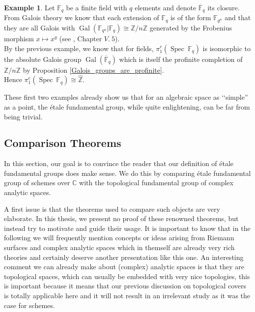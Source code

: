 \documentclass{article}
\theoremstyle{plain}
\theoremstyle{definition}
\newtheorem{example}[theorem]{Example}
\DeclareMathOperator{\Spec}{Spec}
\DeclareMathOperator{\Gal}{Gal}
\begin{document}
\begin{example}
    Let $\mathbb{F}_q$ be a finite field with $q$ elements and denote $\overline{\mathbb{F}}_q$ its closure.
    From Galois theory we know that each extension of $\mathbb{F}_q$ is of the form $\mathbb{F}_{q^n}$ and that they are all Galois with $\Gal(\mathbb{F}_{q^n}|\mathbb{F}_q) \cong \mathbb{Z}/n\mathbb{Z}$ generated by the Frobenius morphism $x\mapsto x^q$ (see \cite{Lang_algebra}, Chapter $V.\:5$).\\
    By the previous example, we know that for fields, $\pi^e_1(\Spec\: \mathbb{F}_q)$ is isomorphic to the absolute Galois group  $\Gal(\overline{\mathbb{F}}_q)$ which is itself the profinite completion of $\mathbb{Z}/n\mathbb{Z}$ by Proposition \ref{Galois_groups_are_profinite}.\\
    Hence $\pi^e_1(\Spec\: \mathbb{F}_q) \cong \widehat{\mathbb{Z}}$.
\end{example}


\noindent These first two examples  already show us that for an algebraic space as ‘‘simple'' as a point, the \'etale fundamental group, while quite enlightening, can be far from being trivial.\\


\subsection{Comparison Theorems}
\label{comparaison_theorem}

In this section, our goal is to convince the reader that our definition of \'etale fundamental groups does make sense. 
We do this by comparing \'etale fundamental group of schemes over $\mathbb{C}$ with the topological fundamental group of complex analytic spaces.

\noindent A first issue is that the theorems used to compare such objects are very elaborate. 
In this thesis, we present no proof of these renowned theorems, but instead try to motivate and guide their usage. 
It is important to know that in the following we will frequently mention concepts or ideas arising from Riemann surfaces and complex analytic spaces which in themself are already very rich theories and certainly deserve another presentation like this one.
An interesting comment we can already make about (complex) analytic spaces is that they are topological spaces, which can usually be embedded with very nice topologies, this is important because it means that our previous discussion on topological covers is totally applicable here and it will not result in an irrelevant study as it was the case for schemes.\\
\end{document}
